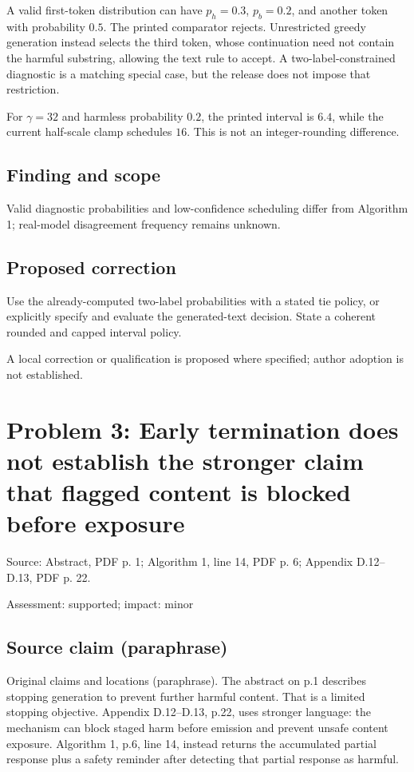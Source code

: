\documentclass[11pt]{article}
\begin{document}
A valid first-token distribution can have \(p_h=0.3\), \(p_b=0.2\), and another token with probability \(0.5\). The printed comparator rejects. Unrestricted greedy generation instead selects the third token, whose continuation need not contain the harmful substring, allowing the text rule to accept. A two-label-constrained diagnostic is a matching special case, but the release does not impose that restriction.

For \(\gamma=32\) and harmless probability \(0.2\), the printed interval is \(6.4\), while the current half-scale clamp schedules \(16\). This is not an integer-rounding difference.

\subsection*{Finding and scope}

Valid diagnostic probabilities and low-confidence scheduling differ from Algorithm 1; real-model disagreement frequency remains unknown.

\subsection*{Proposed correction}

Use the already-computed two-label probabilities with a stated tie policy, or explicitly specify and evaluate the generated-text decision. State a coherent rounded and capped interval policy.

A local correction or qualification is proposed where specified; author adoption is not established.

\section*{Problem 3: Early termination does not establish the stronger claim that flagged content is blocked before exposure}

Source: Abstract, PDF p. 1; Algorithm 1, line 14, PDF p. 6; Appendix D.12–D.13, PDF p. 22.

Assessment: supported; impact: minor

\subsection*{Source claim (paraphrase)}

Original claims and locations (paraphrase). The abstract on p.1 describes stopping generation to prevent further harmful content. That is a limited stopping objective. Appendix D.12–D.13, p.22, uses stronger language: the mechanism can block staged harm before emission and prevent unsafe content exposure. Algorithm 1, p.6, line 14, instead returns the accumulated partial response plus a safety reminder after detecting that partial response as harmful.
\end{document}
